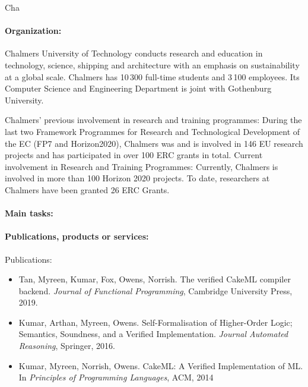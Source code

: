 \begin{sitedescription}{Cha}

\paragraph{Organization:}

Chalmers University of Technology conducts research and education in
technology, science, shipping and architecture with an emphasis on
sustainability at a global scale. Chalmers has 10\,300 full-time
students and 3\,100 employees.  Its Computer Science and Engineering
Department is joint with Gothenburg University.

Chalmers' previous involvement in research and training programmes:
During the last two Framework Programmes for Research and
Technological Development of the EC (FP7 and Horizon2020), Chalmers
was and is involved in 146 EU research projects and has participated
in over 100 ERC grants in total.  Current involvement in Research and
Training Programmes: Currently, Chalmers is involved in more than 100
Horizon 2020 projects.  To date, researchers at Chalmers have been
granted 26 ERC Grants.


\paragraph{Main tasks:}

\begin{compactitem}
\item{}
\end{compactitem}

\paragraph{Publications, products or services:}

Publications:
\begin{itemize}
\item
  Tan, Myreen, Kumar, Fox, Owens, Norrish.
  The verified CakeML compiler backend.
  \emph{Journal of Functional Programming}, Cambridge University Press, 2019.
\item
  Kumar, Arthan, Myreen, Owens.
  Self-Formalisation of Higher-Order Logic;
  Semantics, Soundness, and a Verified Implementation.
  \emph{Journal Automated Reasoning}, Springer, 2016.
\item
  Kumar, Myreen, Norrish, Owens.
  CakeML: A Verified Implementation of ML.
  In \emph{Principles of Programming Languages}, ACM, 2014
\end{itemize}


\end{sitedescription}
